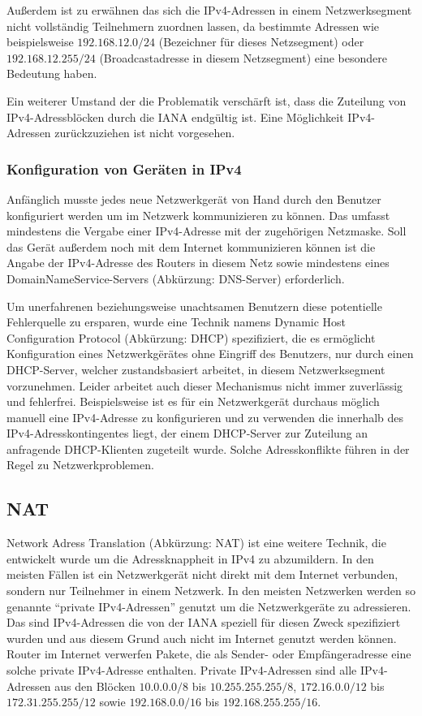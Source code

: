\documentclass[a4paper,12pt]{scrartcl}
\begin{document}
Au\ss{}erdem ist zu erw\"ahnen das sich die IPv4-Adressen in einem Netzwerksegment nicht vollst\"andig Teilnehmern zuordnen lassen, da bestimmte Adressen wie beispielsweise $192.168.12.0/24$ (Bezeichner f\"ur dieses Netzsegment) oder $192.168.12.255/24$ (Broadcastadresse in diesem Netzsegment) eine besondere Bedeutung haben. 

Ein weiterer Umstand der die Problematik versch\"arft ist, dass die Zuteilung von IPv4-Adressbl\"ocken durch die IANA endg\"ultig ist. Eine M\"oglichkeit IPv4-Adressen zur\"uckzuziehen ist nicht vorgesehen. 


\subsubsection{Konfiguration von Ger\"aten in IPv4}

Anf\"anglich musste jedes neue Netzwerkger\"at von Hand durch den Benutzer konfiguriert werden um im Netzwerk kommunizieren zu k\"onnen. Das umfasst mindestens die Vergabe einer IPv4-Adresse mit der zugeh\"origen Netzmaske. Soll das Ger\"at au\ss{}erdem noch mit dem Internet kommunizieren k\"onnen ist die Angabe der IPv4-Adresse des Routers in diesem Netz sowie mindestens eines DomainNameService-Servers (Abk\"urzung: DNS-Server) erforderlich. 

Um unerfahrenen beziehungsweise unachtsamen Benutzern diese potentielle Fehlerquelle zu ersparen, wurde eine Technik namens Dynamic Host Configuration Protocol (Abk\"urzung: DHCP) \cite[RFC2131]{rfcdhcp} spezifiziert, die es erm\"oglicht Konfiguration eines Netzwerkg\"er\"ates ohne Eingriff des Benutzers, nur durch einen DHCP-Server, welcher zustandsbasiert arbeitet,  in diesem Netzwerksegment vorzunehmen. Leider arbeitet auch dieser Mechanismus nicht immer zuverl\"assig und fehlerfrei. Beispielsweise ist es f\"ur ein Netzwerkger\"at durchaus m\"oglich manuell eine IPv4-Adresse zu konfigurieren und zu verwenden die innerhalb des IPv4-Adresskontingentes liegt, der einem DHCP-Server zur Zuteilung an anfragende DHCP-Klienten zugeteilt wurde. Solche Adresskonflikte f\"uhren in der Regel zu Netzwerkproblemen.


\subsection{NAT}
Network Adress Translation (Abk\"urzung: NAT) \cite[RFC1631]{rfcnat} ist eine weitere Technik, die entwickelt wurde um die Adressknappheit in IPv4 zu abzumildern. In den meisten F\"allen ist ein Netzwerkger\"at nicht direkt mit dem Internet verbunden, sondern nur Teilnehmer in einem Netzwerk. In den meisten Netzwerken werden so genannte "`private IPv4-Adressen"' genutzt um die Netzwerkger\"ate zu adressieren. Das sind IPv4-Adressen die von der IANA speziell f\"ur diesen Zweck spezifiziert wurden und aus diesem Grund auch nicht im Internet genutzt werden k\"onnen. Router im Internet verwerfen Pakete, die als Sender- oder Empf\"angeradresse eine solche private IPv4-Adresse enthalten. Private IPv4-Adressen sind alle IPv4-Adressen aus den Bl\"ocken $10.0.0.0/8$ bis $10.255.255.255/8$, $172.16.0.0/12$ bis $172.31.255.255/12$ sowie $192.168.0.0/16$ bis $192.168.255.255/16$. 
\end{document}

